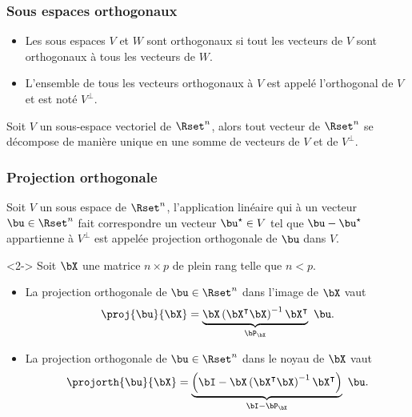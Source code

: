 \documentclass{beamer}\usepackage[]{graphicx}\usepackage[]{color}
\begin{document}
\begin{frame}
  \frametitle{Sous espaces orthogonaux}

  \begin{definitionf}
    \vspace{-.25cm}
    \begin{itemize}
    \item Les  sous espaces $V$  et $W$  sont orthogonaux si  tout les
      vecteurs de $V$ sont orthogonaux à tous les vecteurs de $W$.
    \item L'ensemble de tous les vecteurs orthogonaux à $V$ est appelé
      l'orthogonal de $V$ et est noté $V^\bot$.
    \end{itemize}    
  \end{definitionf}
  
  \begin{theoreme}
    Soit $V$ un sous-espace vectoriel de $\Rset^n$, alors tout vecteur
    de  $\Rset^n$ se  décompose  de  manière unique  en  une somme  de
    vecteurs de $V$ et de $V^\bot$.
  \end{theoreme}
  
\end{frame}

\begin{frame}
  \frametitle{Projection orthogonale}

  \begin{definitionf}
    Soit $V$ un sous espace de $\Rset^n$, l'application linéaire qui à
    un   vecteur   $\bu\in\Rset^n$   fait  correspondre   un   vecteur
    $\bu^\star\in V$ tel que $\bu  - \bu^\star$ appartienne à $V^\bot$
    est appelée projection orthogonale de $\bu$ dans $V$.
  \end{definitionf}
  
  \begin{definitionf}<2-> Soit $\bX$
    une matrice $n\times p$ de plein rang telle que $n < p$.
    \begin{itemize}
    \item<2-> La projection orthogonale de $\bu\in\Rset^n$ dans l'image de $\bX$ vaut
      \begin{equation*}
        \proj{\bu}{\bX} = \underbrace{\bX \left(\bX^\intercal \bX\right)^{-1} \bX^\intercal}_{\bP_\bX}\ \bu.
      \end{equation*}
    \item<3> La projection orthogonale de $\bu\in\Rset^n$ dans le noyau de $\bX$ vaut
      \begin{equation*}
        \projorth{\bu}{\bX} = \underbrace{\left(\bI - \bX \left(\bX^\intercal \bX\right)^{-1} \bX^\intercal\right)}_{\bI - \bP_\bX} \ \bu.
      \end{equation*}       
    \end{itemize}
  \end{definitionf}
  
\end{frame}
\end{document}
